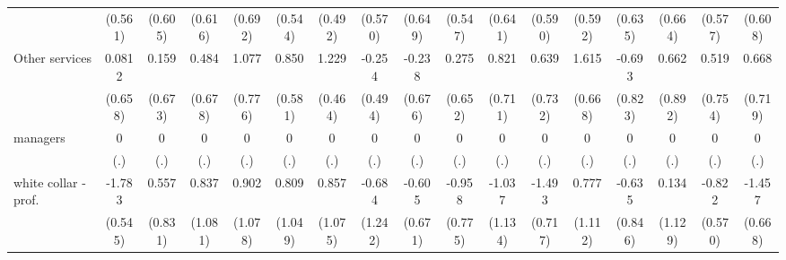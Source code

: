 {\begin{tabular}{l*{16}{c}}
                    &     (0.561)         &     (0.605)         &     (0.616)         &     (0.692)         &     (0.544)         &     (0.492)         &     (0.570)         &     (0.649)         &     (0.547)         &     (0.641)         &     (0.590)         &     (0.592)         &     (0.635)         &     (0.664)         &     (0.577)         &     (0.608)         \\
[1em]
Other services      &      0.0812         &       0.159         &       0.484         &       1.077         &       0.850         &       1.229\sym{**} &      -0.254         &      -0.238         &       0.275         &       0.821         &       0.639         &       1.615\sym{*}  &      -0.693         &       0.662         &       0.519         &       0.668         \\
                    &     (0.658)         &     (0.673)         &     (0.678)         &     (0.776)         &     (0.581)         &     (0.464)         &     (0.494)         &     (0.676)         &     (0.652)         &     (0.711)         &     (0.732)         &     (0.668)         &     (0.823)         &     (0.892)         &     (0.754)         &     (0.719)         \\
[1em]
managers            &           0         &           0         &           0         &           0         &           0         &           0         &           0         &           0         &           0         &           0         &           0         &           0         &           0         &           0         &           0         &           0         \\
                    &         (.)         &         (.)         &         (.)         &         (.)         &         (.)         &         (.)         &         (.)         &         (.)         &         (.)         &         (.)         &         (.)         &         (.)         &         (.)         &         (.)         &         (.)         &         (.)         \\
[1em]
white collar - prof.&      -1.783\sym{**} &       0.557         &       0.837         &       0.902         &       0.809         &       0.857         &      -0.684         &      -0.605         &      -0.958         &      -1.037         &      -1.493\sym{*}  &       0.777         &      -0.635         &       0.134         &      -0.822         &      -1.457\sym{*}  \\
                    &     (0.545)         &     (0.831)         &     (1.081)         &     (1.078)         &     (1.049)         &     (1.075)         &     (1.242)         &     (0.671)         &     (0.775)         &     (1.134)         &     (0.717)         &     (1.112)         &     (0.846)         &     (1.129)         &     (0.570)         &     (0.668)         \\

\end{tabular}}
